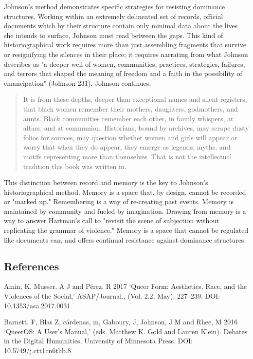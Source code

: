 \documentclass[11pt]{article}
\begin{document}
Johnson's method demonstrates specific strategies for resisting
dominance structures. Working within an extremely delineated set of
records, official documents which by their structure contain only
minimal data about the lives she intends to surface, Johnson must read
between the gaps. This kind of historiographical work requires more
than just assembling fragments that survive or resignifying the
silences in their place; it requires narrating from what Johnson
describes as "a deeper well of women, communities, practices,
strategies, failures, and terrors that shaped the meaning of freedom
and a faith in the possibility of emancipation" (Johnson 231). Johnson
continues,
\begin{quote}
It is from these depths, deeper than exceptional names and silent
registers, that black women remember their mothers, daughters,
godmothers, and aunts. Black communities remember each other, in
family whispers, at altars, and at communion. Historians, bound by
archives, may scrape dusty folios for sources, may question whether
women and girls will appear or worry that when they do appear, they
emerge as legends, myths, and motifs representing more than
themselves. That is not the intellectual tradition this book was
written in. 
\end{quote}
This distinction between record and memory is the key to Johnson's
historiographical method. Memory is a space that, by design, cannot be
recorded or "marked up." Remembering is a way of re-creating past
events. Memory is maintained by community and fueled by
imagination. Drawing from memory is a way to answer Hartman's call to
"revisit the scene of subjection without replicating the grammar of
violence." Memory is a space that cannot be regulated like documents
can, and offers continual resistance against dominance structures.



\subsection{References}
\label{sec:org56cb1bd}

Amin, K, Musser, A J and Pérez, R 2017 ‘Queer Form:
Aesthetics, Race, and the Violences of the Social,' ASAP/Journal., (Vol.
2.2, May), 227--239. DOI: 10.1353/asa.2017.0031

Barnett, F, Blas Z, cárdenas, m, Gaboury, J, Johnson, J M and
Rhee, M 2016 ‘QueerOS: A User's Manual,' (eds. Matthew K. Gold and
Lauren Klein). Debates in the Digital Humanities, University of
Minnesota Press. DOI: 10.5749/j.ctt1cn6thb.8
\end{document}
